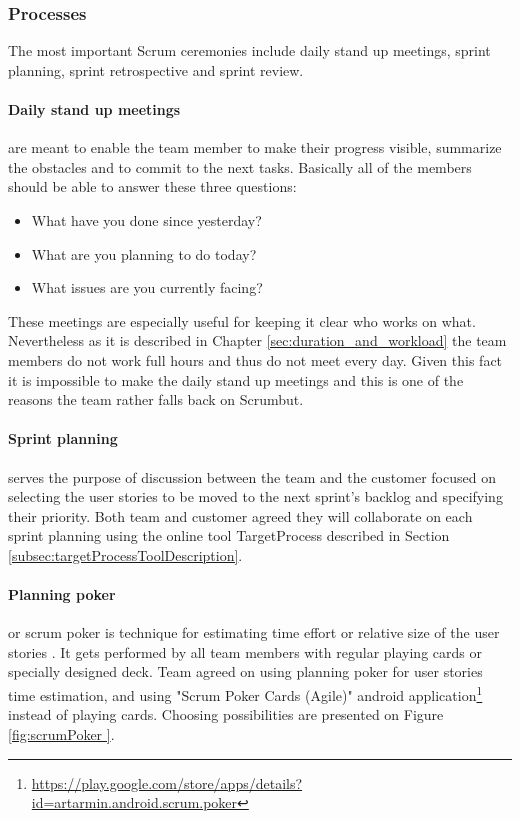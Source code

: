 \subsubsection{Processes}
The most important Scrum ceremonies include daily stand up meetings, sprint planning, sprint retrospective and sprint review.

\paragraph{Daily stand up meetings} are meant to enable the team member to make their progress visible, summarize the obstacles and to commit to the next tasks. Basically all of the members should be able to answer these three questions:

\begin{itemize}
\item What have you done since yesterday?
\item What are you planning to do today?
\item What issues are you currently facing?
\end{itemize}

These meetings are especially useful for keeping it clear who works on what. Nevertheless as it is described in Chapter \ref{sec:duration_and_workload} the team members do not work full hours and thus do not meet every day. Given this fact it is impossible to make the daily stand up meetings and this is one of the reasons the team rather falls back on Scrumbut.

\paragraph{Sprint planning} serves the purpose of discussion between the team and the customer focused on selecting the user stories to be moved to the next sprint's backlog and specifying their priority. Both team and customer agreed they will collaborate on each sprint planning using the online tool TargetProcess described in Section \ref{subsec:targetProcessToolDescription}.

\paragraph{Planning poker} or scrum poker is technique for estimating time effort or relative size of the user stories \cite{cohn2005agile}. It gets performed by all team members with regular playing cards or specially designed deck. Team agreed on using planning poker for user stories time estimation, and using "Scrum Poker Cards (Agile)" android application\footnote{\url{https://play.google.com/store/apps/details?id=artarmin.android.scrum.poker}} instead of playing cards. Choosing possibilities are presented on Figure \ref{fig:scrumPoker }.

